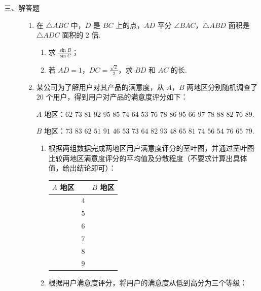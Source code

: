 \begin{description}

    \item[三、解答题]

    \begin{enumerate}[leftmargin=5pt]

      \addtocounter{enumi}{+16}

        \item 在 \(\triangle ABC\) 中，\(D\) 是 \(BC\) 上的点，\(AD\) 平分 \(\angle BAC\)，\(\triangle ABD\) 面积是 \(\triangle ADC\) 面积的 \(2\) 倍.

\begin{enumerate}
\item 求 \(\frac{\sin B}{\sin C}\)；
\item 若 \(AD=1\)，\(DC=\frac{\sqrt{2}}{2}\)，求 \(BD\) 和 \(AC\) 的长.
\end{enumerate}

        \item 某公司为了解用户对其产品的满意度，从 \(A\)，\(B\) 两地区分别随机调查了 \(20\) 个用户，得到用户对产品的满意度评分如下：

\(A\) 地区：\(62\) \(73\) \(81\) \(92\) \(95\) \(85\) \(74\) \(64\) \(53\) \(76\) \(78\) \(86\) \(95\) \(66\) \(97\) \(78\) \(88\) \(82\) \(76\) \(89\).

\(B\) 地区：\(73\) \(83\) \(62\) \(51\) \(91\) \(46\) \(53\) \(73\) \(64\) \(82\) \(93\) \(48\) \(65\) \(81\) \(74\) \(56\) \(54\) \(76\) \(65\) \(79\).

\begin{enumerate}
\item 根据两组数据完成两地区用户满意度评分的茎叶图，并通过茎叶图比较两地区满意度评分的平均值及分散程度（不要求计算出具体值，给出结论即可）：

\begin{center}
\begin{tabular}{c|c|c}
\(A\) 地区 & & \(B\) 地区 \\
\hline
 & \(4\) & \\
 & \(5\) & \\
 & \(6\) & \\
 & \(7\) & \\
 & \(8\) & \\
 & \(9\) & \\
\end{tabular}
\end{center}

\item 根据用户满意度评分，将用户的满意度从低到高分为三个等级：


\end{enumerate}
\end{enumerate}
\end{description}
